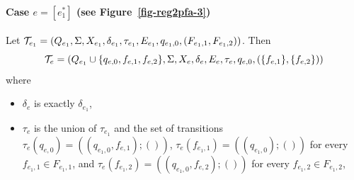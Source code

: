 
\paragraph{Case $e = [e_1^{\ast}]$ (see Figure~\ref{fig-reg2pfa-3})} 
Let $\mathcal{T}_{e_1} = (Q_{e_1}, \Sigma, X_{e_1}, \delta_{e_1}, \tau_{e_1}, E_{e_1}, q_{e_1,0}, (F_{e_1,1}, F_{e_1,2}))$. Then
\[ \mathcal{T}_e = (Q_{e_1} \cup \{q_{e,0}, f_{e,1}, f_{e,2}\}, \Sigma, X_{e}, \delta_e, E_{e}, \tau_e, q_{e,0}, (\{f_{e,1}\}, \{f_{e,2}\}))\] where 
		\begin{itemize}
			
			\item $\delta_e$ is exactly $\delta_{e_1}$,
%
			\item $\tau_e$ is the union of $\tau_{e_1}$ and the set of transitions $\tau_e(q_{e,0}) = ((q_{e_1,0}, f_{e,1}); ())$,  $\tau_e(f_{e_1,1}) = ((q_{e_1,0});())$ for every $f_{e_1,1} \in F_{e_1,1}$, and $\tau_e(f_{e_1,2}) = ((q_{e_1,0}, f_{e,2});())$ for every $f_{e_1,2} \in F_{e_1,2}$,

\end{itemize}
